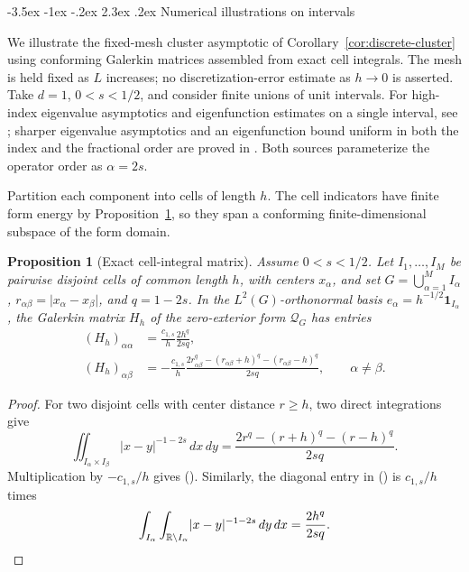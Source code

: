 \documentclass[twoside,10pt]{article}
\makeatletter
\numberwithin{equation}{section}
\theoremstyle{slbody}
\newtheorem{proposition}[theorem]{Proposition}
\theoremstyle{definition}
\newcommand{\R}{\mathbb{R}}
\newcommand{\abs}[1]{\lvert #1\rvert}
\renewcommand{\section}{%
  \@startsection{section}{1}{\z@}%
    {-3.5ex \@plus -1ex \@minus -.2ex}%
    {2.3ex \@plus .2ex}%
    {\normalfont\large\bfseries}}
\renewcommand{\eqref}[1]{%
  \textup{{\normalfont(\oldstylenums{\ref{#1}}}\normalfont)}}
\makeatother
\begin{document}
\section{Numerical illustrations on intervals}\label{sec:numerics}

We illustrate the fixed-mesh cluster asymptotic of
Corollary~\ref{cor:discrete-cluster} using conforming Galerkin matrices
assembled from exact cell integrals.  The mesh is held fixed as $L$ increases;
no discretization-error estimate as $h\to0$ is asserted.  Take $d=1$,
$0<s<1/2$, and consider finite unions of unit intervals.  For high-index
eigenvalue asymptotics and eigenfunction estimates on a single interval, see
\cite[Theorem~1 and Propositions~1--2]{Kwasnicki2012}; sharper eigenvalue
asymptotics and an eigenfunction bound uniform in both the index and the
fractional order are proved in \cite[Theorems~1 and~2]{Zhang2026}.  Both
sources parameterize the operator order as $\alpha=2s$.

Partition each component into cells of length $h$.  The cell
indicators have finite form energy by Proposition~\ref{prop:cell-matrix}, so
they span a conforming finite-dimensional subspace of the form domain.

\begin{proposition}[Exact cell-integral matrix]\label{prop:cell-matrix}
Assume $0<s<1/2$.  Let $I_1,\dots,I_M$ be pairwise disjoint cells of common
length $h$, with centers $x_\alpha$, and set $G=\bigcup_{\alpha=1}^M I_\alpha$,
$r_{\alpha\beta}=\abs{x_\alpha-x_\beta}$, and $q=1-2s$.  In the
$L^2(G)$-orthonormal basis $e_\alpha=h^{-1/2}\mathbf 1_{I_\alpha}$, the
Galerkin matrix $H_h$ of the zero-exterior form $\mathcal{Q}_G$ has entries
\begin{align}
 (H_h)_{\alpha\alpha}
 &=\frac{c_{1,s}}{h}\frac{2h^q}{2s q},
 \label{eq:cell-diagonal}\\
 (H_h)_{\alpha\beta}
 &=-\frac{c_{1,s}}{h}
 \frac{2r_{\alpha\beta}^q-(r_{\alpha\beta}+h)^q
 -(r_{\alpha\beta}-h)^q}{2s q},
 \qquad \alpha\ne\beta.
 \label{eq:cell-offdiagonal}
\end{align}
\end{proposition}

\begin{proof}
For two disjoint cells with center distance $r\geq h$, two direct
integrations give
\[
 \iint_{I_\alpha\times I_\beta}\abs{x-y}^{-1-2s}\,dx\,dy
 =\frac{2r^q-(r+h)^q-(r-h)^q}{2s q}.
\]
Multiplication by $-c_{1,s}/h$ gives \eqref{eq:cell-offdiagonal}.
Similarly, the diagonal entry in \eqref{eq:cell-diagonal} is $c_{1,s}/h$ times
\[
 \int_{I_\alpha}\int_{\R\setminus I_\alpha}
 \abs{x-y}^{-1-2s}\,dy\,dx
 =\frac{2h^q}{2s q}.\qedhere
\]
\end{proof}
\end{document}
